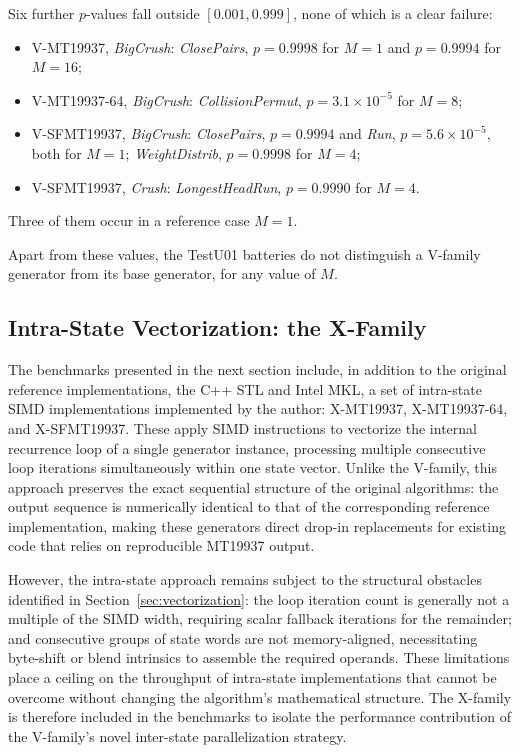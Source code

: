 \documentclass[preprint,1p,times]{elsarticle}
\begin{document}
Six further $p$-values fall outside $[0.001, 0.999]$, none of which is a clear failure:
\begin{itemize}
    \item V-MT19937, \textit{BigCrush}: \textit{ClosePairs}, $p=0.9998$ for $M=1$ and $p=0.9994$ for $M=16$;
    \item V-MT19937-64, \textit{BigCrush}: \textit{CollisionPermut}, $p=3.1\times10^{-5}$ for $M=8$;
    \item V-SFMT19937, \textit{BigCrush}: \textit{ClosePairs}, $p=0.9994$ and \textit{Run}, $p=5.6\times10^{-5}$, both for $M=1$; \textit{WeightDistrib}, $p=0.9998$ for $M=4$;
    \item V-SFMT19937, \textit{Crush}: \textit{LongestHeadRun}, $p=0.9990$ for $M=4$.
\end{itemize}
Three of them occur in a reference case $M=1$.

Apart from these values, the TestU01 batteries do not distinguish a V-family generator from its base generator, for any value of $M$.

\subsection{Intra-State Vectorization: the X-Family}
\label{sec:xfamily}

The benchmarks presented in the next section include, in addition to the original reference implementations, the C++ STL and Intel MKL, a set of intra-state SIMD implementations implemented by the author: X-MT19937, X-MT19937-64, and X-SFMT19937. These apply SIMD instructions to vectorize the internal recurrence loop of a single generator instance, processing multiple consecutive loop iterations simultaneously within one state vector. Unlike the V-family, this approach preserves the exact sequential structure of the original algorithms: the output sequence is numerically identical to that of the corresponding reference implementation, making these generators direct drop-in replacements for existing code that relies on reproducible MT19937 output.

However, the intra-state approach remains subject to the structural obstacles identified in Section~\ref{sec:vectorization}: the loop iteration count is generally not a multiple of the SIMD width, requiring scalar fallback iterations for the remainder; and consecutive groups of state words are not memory-aligned, necessitating byte-shift or blend intrinsics to assemble the required operands. These limitations place a ceiling on the throughput of intra-state implementations that cannot be overcome without changing the algorithm's mathematical structure. The X-family is therefore included in the benchmarks to isolate the performance contribution of the V-family's novel inter-state parallelization strategy.
\end{document}
